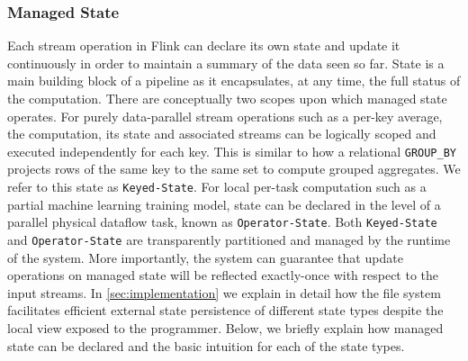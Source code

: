 \subsubsection{Managed State}
\label{sec:managedstate}
Each stream operation in Flink can declare its own state and update it continuously in order to maintain a summary of the data seen so far. State is a main building block of a pipeline as it encapsulates, at any time, the full status of the computation. There are conceptually two scopes upon which managed state operates. For purely data-parallel stream operations such as a per-key average, the computation, its state and associated streams can be logically scoped and executed independently for each key. This is similar to how a relational \texttt{GROUP\_BY} projects rows of the same key to the same set to compute grouped aggregates. We refer to this state as \texttt{Keyed-State}.
For local per-task computation such as a partial machine learning training model, state can be declared in the level of a parallel physical dataflow task, known as \texttt{Operator-State}. Both \texttt{Keyed-State} and \texttt{Operator-State} are transparently partitioned and managed by the runtime of the system. More importantly, the system can guarantee that update operations on managed state will be reflected exactly-once with respect to the input streams. In \autoref{sec:implementation} we explain in detail how the file system facilitates efficient external state persistence of different state types despite the local view exposed to the programmer. Below, we briefly explain how managed state can be declared and the basic intuition for each of the state types. 


